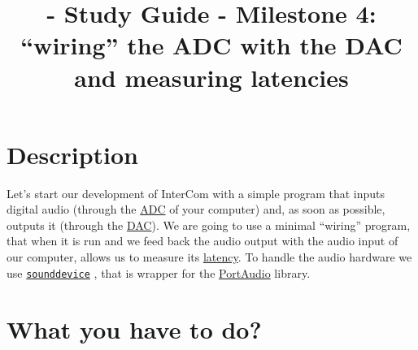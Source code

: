 
\title{\TM - Study Guide - Milestone 4: ``wiring'' the ADC with the DAC and measuring latencies}

\maketitle

\section{Description}

Let's start our development of InterCom with a simple program that
inputs digital audio (through the
\href{https://en.wikipedia.org/wiki/Analog-to-digital_converter}{ADC}
of your computer) and, as soon as possible, outputs it (through the
\href{https://en.wikipedia.org/wiki/Digital-to-analog_converter}{DAC}). We
are going to use a minimal ``wiring'' program, that when it is run and
we feed back the audio output with the audio input of our computer,
allows us to measure
its \href{https://en.wikipedia.org/wiki/Latency_(engineering)}{latency}. To
handle the audio hardware we use
\href{https://python-sounddevice.readthedocs.io}{\texttt{sounddevice}}
\cite{sounddevice}, that is wrapper for the
\href{http://www.portaudio.com/}{PortAudio} library.

\section{What you have to do?}

